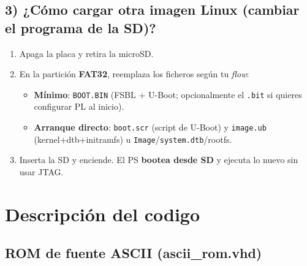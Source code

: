 \documentclass[a4paper,12pt]{article}
\begin{document}
\subsection*{3) ¿Cómo cargar otra imagen Linux (cambiar el programa de la SD)?}
\begin{enumerate}
  \item Apaga la placa y retira la microSD.
  \item En la partición \textbf{FAT32}, reemplaza los ficheros según tu \emph{flow}:
  \begin{itemize}
    \item \textbf{Mínimo}: \texttt{BOOT.BIN} (FSBL + U-Boot; opcionalmente el \texttt{.bit} si quieres configurar PL al inicio).
    \item \textbf{Arranque directo}: \texttt{boot.scr} (script de U-Boot) y \texttt{image.ub} (kernel+dtb+initramfs) u \texttt{Image}/\texttt{system.dtb}/rootfs. 
  \end{itemize}
  \item Inserta la SD y enciende. El PS \textbf{bootea desde SD} y ejecuta lo nuevo sin usar JTAG. 
\end{enumerate}

\section{Descripción del codigo}

\subsection{ROM de fuente ASCII (ascii\_rom.vhd)}
\label{sec:ascii_rom}
\end{document}
